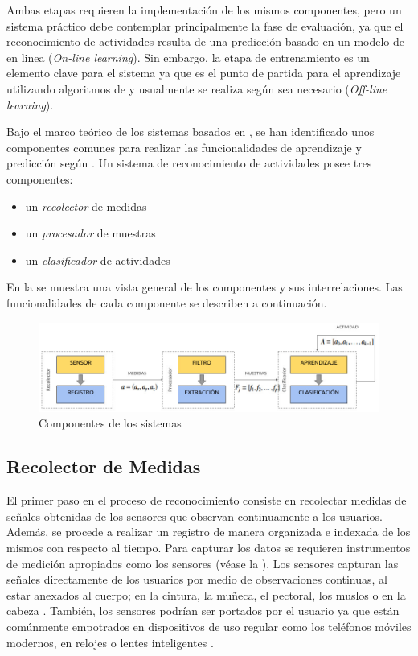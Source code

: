 Ambas etapas requieren la implementación de los mismos componentes,
pero un sistema  práctico debe contemplar principalmente
la fase de evaluación, ya que el reconocimiento de actividades resulta
de una predicción basado en un modelo de  en linea (\emph{On-line
learning}). Sin embargo, la etapa de entrenamiento es un elemento
clave para el sistema ya que es el punto de partida para el aprendizaje
utilizando algoritmos de  y usualmente se realiza según
sea necesario (\emph{Off-line learning}).

Bajo el marco teórico de los sistemas  basados en ,
se han identificado unos componentes comunes para realizar las funcionalidades
de aprendizaje y predicción según \cite{Choudhury2008}. Un sistema
de reconocimiento de actividades posee tres componentes:
\begin{itemize}
\item un \emph{recolector }de medidas
\item un\emph{ procesador }de muestras 
\item un \emph{clasificador }de actividades
\end{itemize}
En la  se muestra una vista general
de los componentes y sus interrelaciones. Las funcionalidades de cada
componente se describen a continuación. 

\begin{figure}[!tbph]
\centering{}\includegraphics[width=1\columnwidth,width=1\linewidth]{capitulo-4/graphics/diagrama_4_1}\caption[Componentes HAR]{\label{fig4:componentes-har}Componentes de los sistemas }
\end{figure}


\subsection{Recolector de Medidas}

\label{sec43:recolector-datos}El primer paso en el proceso de reconocimiento
consiste en recolectar medidas de señales obtenidas de los sensores
que observan continuamente a los usuarios. Además, se procede a realizar
un registro de manera organizada e indexada de los mismos con respecto
al tiempo. Para capturar los datos se requieren instrumentos de medición
apropiados como los sensores (véase la ).
Los sensores capturan las señales directamente de los usuarios por
medio de observaciones continuas, al estar anexados al cuerpo; en
la cintura, la muñeca, el pectoral, los muslos o en la cabeza \cite{Bao2004}.
También, los sensores podrían ser portados por el usuario ya que están
comúnmente empotrados en dispositivos de uso regular como los teléfonos
móviles modernos, en relojes o lentes inteligentes \cite{LaraLabrador2012,Choudhury2008}.

